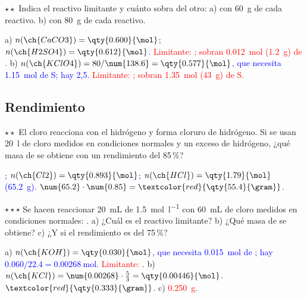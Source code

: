 \begin{exercise}
    \(\star\star\) Indica el reactivo limitante y cuánto sobra del otro: a)  con
    \qty{60}{\gram} de cada reactivo. b)  con \qty{80}{\gram} de cada reactivo.
    \begin{solu}
        a) \textcolor{blue}{\(n(\ch{CaCO3}) = \qty{0.600}{\mol}\); \(n(\ch{H2SO4}) = \qty{0.612}{\mol}\).} \textcolor{red}{Limitante:
        ; sobran \qty{0.012}{\mol} (\qty{1.2}{\gram}) de .} b) \textcolor{blue}{\(n(\ch{KClO4}) = 80/\num{138.6} =
        \qty{0.577}{\mol}\), que necesita \qty{1.15}{\mol} de S; hay 2,5.} \textcolor{red}{Limitante: ; sobran
        \qty{1.35}{\mol} (\qty{43}{\gram}) de S.}
    \end{solu}
\end{exercise}

\subsection{Rendimiento}

\begin{exercise}
    \(\star\star\) El cloro reacciona con el hidrógeno y forma cloruro de hidrógeno. Si se usan \qty{20}{\litre} de cloro medidos
    en condiciones normales y un exceso de hidrógeno, ¿qué masa de  se obtiene con un rendimiento del 85\,\%?
    \begin{solu}
        \textcolor{blue}{; \(n(\ch{Cl2}) = \qty{0.893}{\mol}\); \(n(\ch{HCl}) = \qty{1.79}{\mol}\) (\qty{65.2}{\gram}).}
        \(\num{65.2} \cdot \num{0.85} = \textcolor{red}{\qty{55.4}{\gram}}\).
    \end{solu}
\end{exercise}

\begin{exercise}
    \(\star\star\star\) Se hacen reaccionar \qty{20}{\mL} de  \qty{1.5}{\mol\per\litre} con \qty{60}{\mL} de cloro medidos
    en condiciones normales: . a) ¿Cuál es el reactivo limitante? b) ¿Qué masa de
     se obtiene? c) ¿Y si el rendimiento es del 75\,\%?
    \begin{solu}
        a) \textcolor{blue}{\(n(\ch{KOH}) = \qty{0.030}{\mol}\), que necesita \qty{0.015}{\mol} de ; hay \(\num{0.060}/\num{22.4} =
        \qty{0.00268}{\mol}\).} \textcolor{red}{Limitante: }. b) \textcolor{blue}{\(n(\ch{KCl}) = \num{0.00268} \cdot \frac{5}{3} =
        \qty{0.00446}{\mol}\).} \(\textcolor{red}{\qty{0.333}{\gram}}\). c) \textcolor{red}{\qty{0.250}{\gram}}.
    \end{solu}
\end{exercise}

